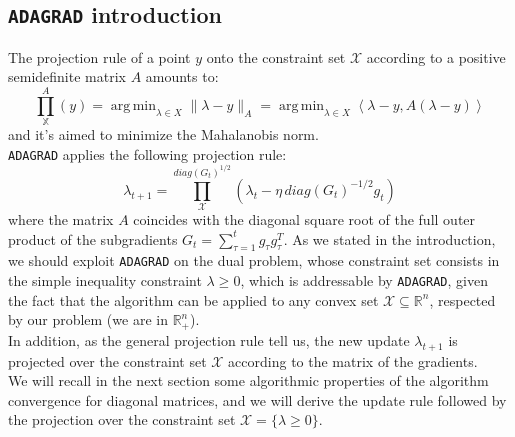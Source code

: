 \documentclass[notitlepage]{article}
\DeclareMathOperator*{\argmin}{arg\,min}
\begin{document}
\subsection{\texttt{ADAGRAD} introduction}
The projection rule of a point $y$ onto the constraint set $\mathcal{X}$ according to a positive semidefinite matrix $A$ amounts to:
\[ \prod_\mathbb{X}^A (y) = \argmin_{\lambda \in X} \| \lambda-y \|_A = \argmin_{\lambda \in X} \left\langle \lambda-y,A(\lambda-y) \right\rangle \]
and it's aimed to minimize the Mahalanobis norm.\\
\texttt{ADAGRAD} applies the following projection rule:
\begin{equation}
  \lambda_{t+1} = \prod_\mathcal{X}^{diag(G_t)^{1/2}} (\lambda_t - \eta \, diag(G_t)^{-1/2} g_t) 
  \label{eqn:projection}
\end{equation}
where the matrix $A$ coincides with the diagonal square root of the full outer product of the subgradients $G_t = \sum_{\tau=1}^t g_\tau g_\tau^T$.
As we stated in the introduction, we should exploit \texttt{ADAGRAD} on the dual problem, whose constraint set consists in the simple inequality constraint $\lambda \ge 0$, which is addressable by \texttt{ADAGRAD},
given the fact that the algorithm can be applied to any convex set $\mathcal{X} \subseteq \mathbb{R}^n$, respected by our problem (we are in $\mathbb{R}_+^n$).\\
In addition, as the general projection rule tell us, the new update $\lambda_{t+1}$ is projected over the constraint set $\mathcal{X}$ according to the matrix of the gradients.\\
We will recall in the next section some algorithmic properties of the algorithm convergence for diagonal matrices, and we will derive the update rule followed by the projection over the constraint set $\mathcal{X} = \{\lambda \ge 0\}$.
\end{document}

